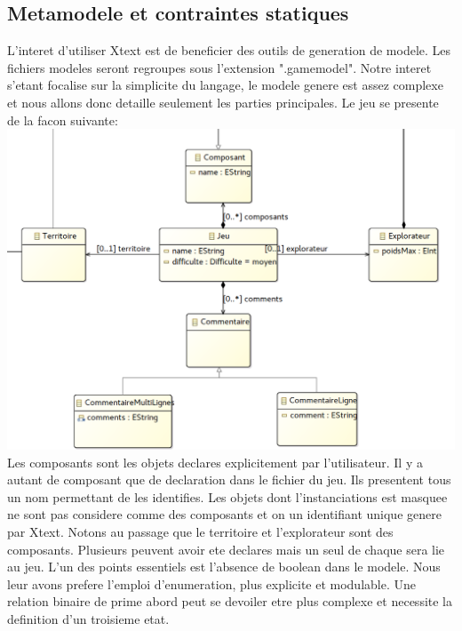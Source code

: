 \documentclass[12pt]{article}
\begin{document}
\subsection{Metamodele et contraintes statiques}
L'interet d'utiliser Xtext est de beneficier des outils de generation de modele. Les fichiers modeles seront regroupes sous l'extension ".gamemodel". Notre interet s'etant focalise sur la simplicite du langage, le modele genere est assez complexe et nous allons donc detaille seulement les parties principales.\newline
Le jeu se presente de la facon suivante:
\newline\newline
\includegraphics[width=\textwidth]{images/diagram_Jeu}
\newline\newline
Les composants sont les objets declares explicitement par l'utilisateur. Il y a autant de composant que de declaration dans le fichier du jeu. Ils presentent tous un nom permettant de les identifies. Les objets dont l'instanciations est masquee ne sont pas considere comme des composants et on un identifiant unique genere par Xtext. Notons au passage que le territoire et l'explorateur sont des composants. Plusieurs peuvent avoir ete declares mais un seul de chaque sera lie au jeu.\newline
\newline
L'un des points essentiels est l'absence de boolean dans le modele. Nous leur avons prefere l'emploi d'enumeration, plus explicite et modulable. Une relation binaire de prime abord peut se devoiler etre plus complexe et necessite la definition d'un troisieme etat.
\newline\newline
\end{document}
